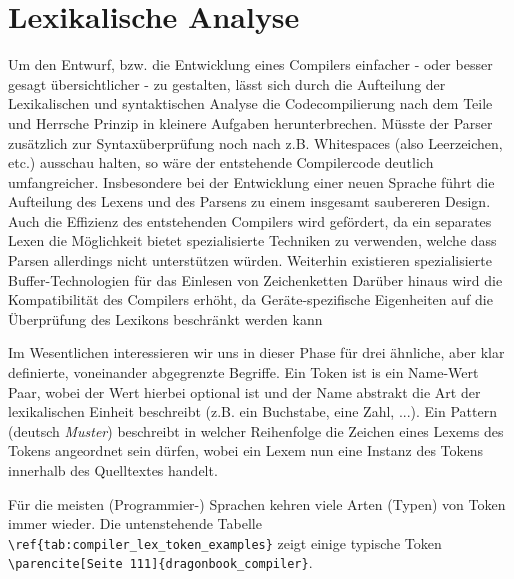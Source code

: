 \documentclass{standalone}
\begin{document}


\chapter{Lexikalische Analyse}
Um den Entwurf, bzw. die Entwicklung eines Compilers einfacher - oder besser gesagt übersichtlicher - zu gestalten, lässt sich durch die Aufteilung der Lexikalischen und syntaktischen Analyse die Codecompilierung nach dem Teile und Herrsche Prinzip in kleinere Aufgaben herunterbrechen.
Müsste der Parser zusätzlich zur Syntaxüberprüfung noch nach z.B. Whitespaces (also Leerzeichen, etc.) ausschau halten, so wäre der entstehende Compilercode deutlich umfangreicher. Insbesondere bei der Entwicklung einer neuen Sprache führt die Aufteilung des Lexens und des Parsens zu einem insgesamt saubereren Design. 
Auch die Effizienz des entstehenden Compilers wird gefördert, da ein separates Lexen die Möglichkeit bietet spezialisierte Techniken zu verwenden, welche dass Parsen allerdings nicht unterstützen würden. Weiterhin existieren spezialisierte Buffer-Technologien für das Einlesen von Zeichenketten %
Darüber hinaus wird die Kompatibilität  des Compilers erhöht, da Geräte-spezifische Eigenheiten auf die Überprüfung des Lexikons beschränkt werden kann %
\par

Im Wesentlichen interessieren wir uns in dieser Phase für drei ähnliche, aber klar definierte, voneinander abgegrenzte Begriffe. Ein Token ist is ein Name-Wert Paar, wobei der Wert hierbei optional ist und der Name abstrakt die Art der lexikalischen Einheit beschreibt (z.B. ein Buchstabe, eine Zahl, ...). Ein Pattern (deutsch \textit{Muster}) beschreibt in welcher Reihenfolge die Zeichen eines Lexems des Tokens angeordnet sein dürfen, wobei ein Lexem nun eine Instanz des Tokens innerhalb des Quelltextes handelt. 

Für die meisten (Programmier-) Sprachen kehren viele Arten (Typen) von Token immer wieder. Die untenstehende Tabelle \verb|\ref{tab:compiler_lex_token_examples}| zeigt einige typische Token \verb|\parencite[Seite 111]{dragonbook_compiler}|.
\end{document}
